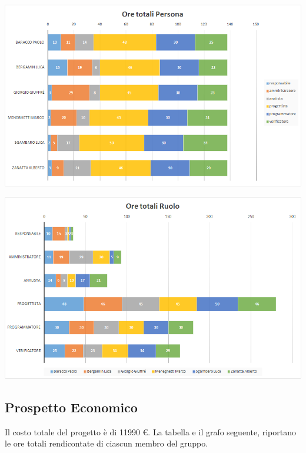 {\includegraphics[width=15cm]{img/oretotali1.png}\par}
{\includegraphics[width=15cm]{img/oretotali3.png}\par}

	\subsection{Prospetto Economico}
Il costo totale del progetto è di 11990 \euro. La tabella e il grafo seguente, riportano le ore totali rendicontate di ciascun membro del gruppo.

